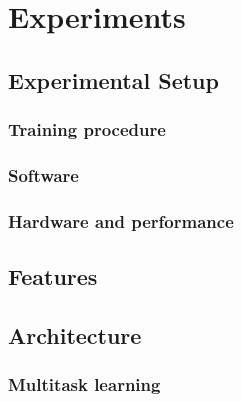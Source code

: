 \chapter{Experiments}%
\label{sec:experiments}

\section{Experimental Setup}
\subsection{Training procedure}
\subsection{Software}
\subsection{Hardware and performance}

\section{Features}


\section{Architecture}
\subsection{Multitask learning}\label{sec:multitask-experiments}

